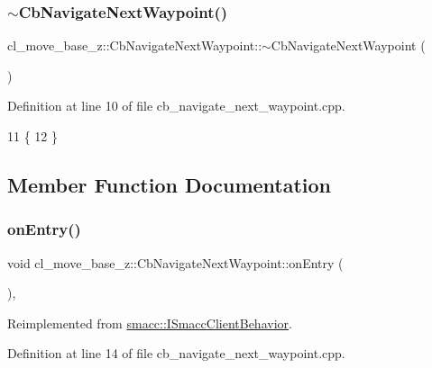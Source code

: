\subsubsection{\texorpdfstring{$\sim$\+Cb\+Navigate\+Next\+Waypoint()}{~CbNavigateNextWaypoint()}}
{\footnotesize\ttfamily cl\+\_\+move\+\_\+base\+\_\+z\+::\+Cb\+Navigate\+Next\+Waypoint\+::$\sim$\+Cb\+Navigate\+Next\+Waypoint (\begin{DoxyParamCaption}{ }\end{DoxyParamCaption})\hspace{0.3cm}{\ttfamily [virtual]}}



Definition at line 10 of file cb\+\_\+navigate\+\_\+next\+\_\+waypoint.\+cpp.


\begin{DoxyCode}
11 \{
12 \}
\end{DoxyCode}


\subsection{Member Function Documentation}
\mbox{\label{classcl__move__base__z_1_1CbNavigateNextWaypoint_a04913ef24344363669c1916b5df28493}} 
\subsubsection{\texorpdfstring{on\+Entry()}{onEntry()}}
{\footnotesize\ttfamily void cl\+\_\+move\+\_\+base\+\_\+z\+::\+Cb\+Navigate\+Next\+Waypoint\+::on\+Entry (\begin{DoxyParamCaption}{ }\end{DoxyParamCaption})\hspace{0.3cm}{\ttfamily [override]}, {\ttfamily [virtual]}}



Reimplemented from \hyperlink{classsmacc_1_1ISmaccClientBehavior_a9877684b1954429719826e2d0924d980}{smacc\+::\+I\+Smacc\+Client\+Behavior}.



Definition at line 14 of file cb\+\_\+navigate\+\_\+next\+\_\+waypoint.\+cpp.



